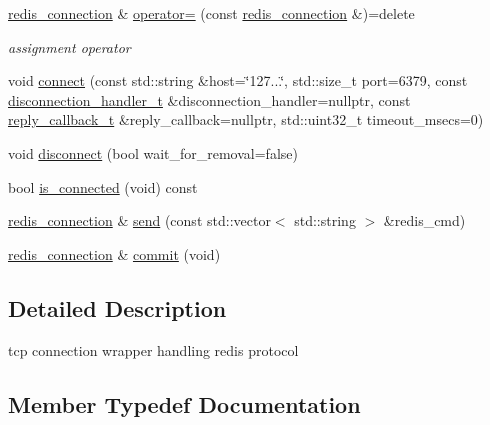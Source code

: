 \begin{DoxyCompactItemize}
\hyperlink{classcpp__redis_1_1network_1_1redis__connection}{redis\+\_\+connection} \& \hyperlink{classcpp__redis_1_1network_1_1redis__connection_a54a4c28ad1b9e9f3bac2854fddf4e30d}{operator=} (const \hyperlink{classcpp__redis_1_1network_1_1redis__connection}{redis\+\_\+connection} \&)=delete
\begin{DoxyCompactList}\small\item\em assignment operator \end{DoxyCompactList}\item 
void \hyperlink{classcpp__redis_1_1network_1_1redis__connection_af105573e46eadbc34a9f5907832df19f}{connect} (const std\+::string \&host=\char`\"{}127...\char`\"{}, std\+::size\+\_\+t port=6379, const \hyperlink{classcpp__redis_1_1network_1_1redis__connection_aba1a229a3d36a5540a80776ed0cf9a44}{disconnection\+\_\+handler\+\_\+t} \&disconnection\+\_\+handler=nullptr, const \hyperlink{classcpp__redis_1_1network_1_1redis__connection_a40f4b55a3103b7436e34211893377245}{reply\+\_\+callback\+\_\+t} \&reply\+\_\+callback=nullptr, std\+::uint32\+\_\+t timeout\+\_\+msecs=0)
\item 
void \hyperlink{classcpp__redis_1_1network_1_1redis__connection_a614a01ce8abd69b44f3d072423d2e696}{disconnect} (bool wait\+\_\+for\+\_\+removal=false)
\item 
bool \hyperlink{classcpp__redis_1_1network_1_1redis__connection_ad3d96826e2e67fb3fed23280237d4d9c}{is\+\_\+connected} (void) const
\item 
\hyperlink{classcpp__redis_1_1network_1_1redis__connection}{redis\+\_\+connection} \& \hyperlink{classcpp__redis_1_1network_1_1redis__connection_a98c163ce431e85e46e139211564b7b3f}{send} (const std\+::vector$<$ std\+::string $>$ \&redis\+\_\+cmd)
\item 
\hyperlink{classcpp__redis_1_1network_1_1redis__connection}{redis\+\_\+connection} \& \hyperlink{classcpp__redis_1_1network_1_1redis__connection_a8e6980d40139877c16e995051b780d60}{commit} (void)
\end{DoxyCompactItemize}


\subsection{Detailed Description}
tcp connection wrapper handling redis protocol 

\subsection{Member Typedef Documentation}
\mbox{\label{classcpp__redis_1_1network_1_1redis__connection_aba1a229a3d36a5540a80776ed0cf9a44}} 
